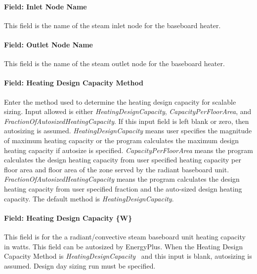 \paragraph{Field: Inlet Node Name}\label{field-inlet-node-name-1-003}

This field is the name of the steam inlet node for the baseboard heater.

\paragraph{Field: Outlet Node Name}\label{field-outlet-node-name-1-004}

This field is the name of the steam outlet node for the baseboard heater.

\paragraph{Field: Heating Design Capacity Method}\label{field-heating-design-capacity-method-1-000}

Enter the method used to determine the heating design capacity for scalable sizing. Input allowed is either \emph{HeatingDesignCapacity}, \emph{CapacityPerFloorArea}, and \emph{FractionOfAutosizedHeatingCapacity}. If this input field is left blank or zero, then autosizing is assumed. \emph{HeatingDesignCapacity} means user specifies the magnitude of maximum heating capacity or the program calculates the maximum design heating capacity if autosize is specified. \emph{CapacityPerFloorArea} means the program calculates the design heating capacity from user specified heating capacity per floor area and floor area of the zone served by the radiant baseboard unit. \emph{FractionOfAutosizedHeatingCapacity} means the program calculates the design heating capacity from user specified fraction and the auto-sized design heating capacity. The default method is \emph{HeatingDesignCapacity}.

\paragraph{Field: Heating Design Capacity \{W\}}\label{field-heating-design-capacity-w-1-000}

This field is for the a radiant/convective steam baseboard unit heating capacity in watts. This field can be autosized by EnergyPlus. When the Heating Design Capacity Method is \emph{HeatingDesignCapacity}~ and this input is blank, autosizing is assumed. Design day sizing run must be specified.

